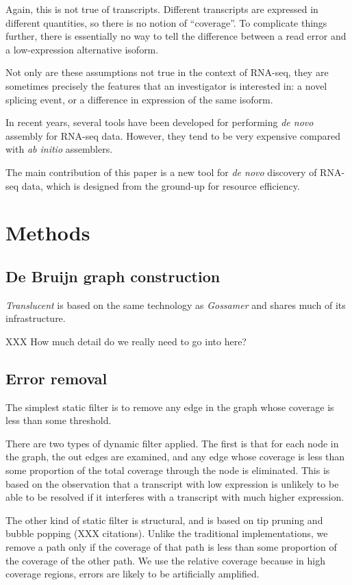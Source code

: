 \documentclass{bioinfo}
\def\Gossamer{\textit{Gossamer}}
\def\Translucent{\textit{Translucent}}
\def\abinitio{\textit{ab initio}}
\def\denovo{\textit{de novo}}
\begin{document}
Again, this is not true of transcripts.
Different transcripts are expressed in different quantities, so
there is no notion of ``coverage''.
To complicate things further, there is essentially no way to tell
the difference between a read error and a low-expression alternative
isoform.

Not only are these assumptions not true in the context of RNA-seq,
they are sometimes precisely the features that an investigator is
interested in: a novel splicing event, or a difference
in expression of the same isoform.

In recent years, several tools have been developed for
performing \denovo{} assembly for RNA-seq data.
However, they tend to be very expensive compared with \abinitio{}
assemblers.

The main contribution of this paper is a new tool for \denovo{}
discovery of RNA-seq data, which is designed from the ground-up
for resource efficiency.

\section{Methods}

\subsection{De Bruijn graph construction}

\Translucent{} is based on the same technology as \Gossamer{} and shares
much of its infrastructure.

XXX How much detail do we really need to go into here?

\subsection{Error removal}

The simplest static filter is to remove any edge in the graph whose
coverage is less than some threshold.

There are two types of dynamic filter applied.
The first is that for each node in the graph, the out edges are
examined, and any edge whose coverage is less than some proportion
of the total coverage through the node is eliminated.
This is based on the observation that a transcript with low expression
is unlikely to be able to be resolved if it interferes with a transcript
with much higher expression.

The other kind of static filter is structural, and is based on
tip pruning and bubble popping (XXX citations).
Unlike the traditional implementations, we remove a path
only if the coverage of that path is less than some
proportion of the coverage of the other path.
We use the relative coverage because in high coverage regions,
errors are likely to be artificially amplified.
\end{document}
